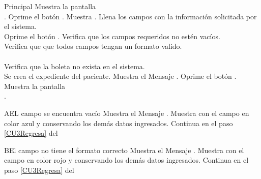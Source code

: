 \begin{UCtrayectoria}{Principal}
    \UCpaso Muestra la pantalla \\.
    \UCpaso[\UCactor] Oprime el botón .
    \UCpaso Muestra .
	\UCpaso[\UCactor] Llena los campos con la información solicitada por el sistema.\label{CU3Regresa}
	\\
	\UCpaso[\UCactor] Oprime el botón .
	\UCpaso Verifica que los campos requeridos no estén vacíos.
	    \\
	\UCpaso Verifica que que todos campos tengan un formato valido.
	    \\
	    \\
	\UCpaso Verifica que la boleta no exista en el sistema.
	    \\
	\UCpaso Se crea el expediente del paciente.
	\UCpaso Muestra el Mensaje \textbf{}.
    \UCpaso[\UCactor] Oprime el botón .
	\UCpaso Muestra la pantalla \\.
\end{UCtrayectoria}


\begin{UCtrayectoriaA}{A}{EL campo se encuentra vacío}
	\UCpaso Muestra el Mensaje \textbf{}.
    \UCpaso Muestra  con el campo en color azul y conservando los demás datos ingresados.
	\UCpaso Continua en el paso \ref{CU3Regresa} del 
\end{UCtrayectoriaA}
		
\begin{UCtrayectoriaA}{B}{El campo no tiene el formato correcto}
    \UCpaso Muestra el Mensaje \textbf{}.
    \UCpaso Muestra  con el campo en color rojo y conservando los demás datos ingresados.
	\UCpaso Continua en el paso \ref{CU3Regresa} del 
\end{UCtrayectoriaA}

